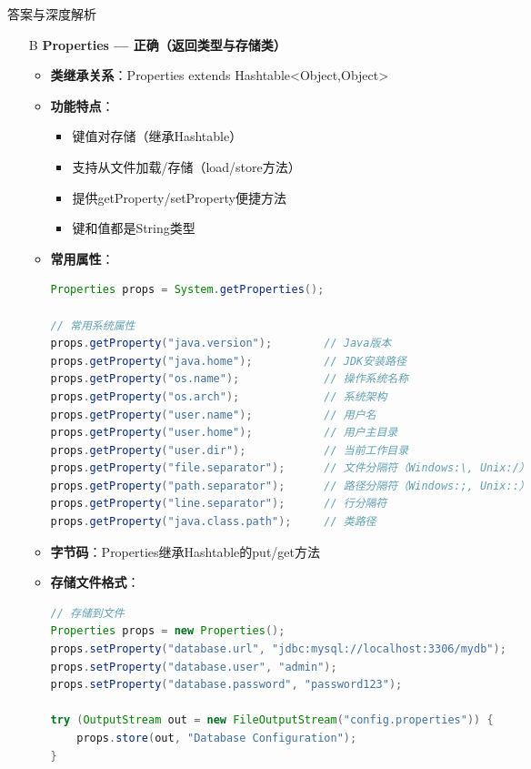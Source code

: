 \documentclass[12pt, a4paper]{ctexart}
\begin{document}
\begin{enumerate}[label=\textbf{\arabic*.}]
\begin{bluebox}{答案与深度解析}
\begin{itemize}[leftmargin=*, nosep, label={}]
			      \item[B] \textbf{Properties — 正确（返回类型与存储类）}
			            \begin{itemize}[label={}, leftmargin=*, nosep]
				            \item \textbf{类继承关系}：Properties extends Hashtable<Object,Object>
				            \item \textbf{功能特点}：
				                  \begin{itemize}[label={}, nosep]
					                  \item 键值对存储（继承Hashtable）
					                  \item 支持从文件加载/存储（load/store方法）
					                  \item 提供getProperty/setProperty便捷方法
					                  \item 键和值都是String类型
				                  \end{itemize}
				            \item \textbf{常用属性}：
				                  \begin{lstlisting}[language=Java]
Properties props = System.getProperties();

// 常用系统属性
props.getProperty("java.version");        // Java版本
props.getProperty("java.home");           // JDK安装路径
props.getProperty("os.name");             // 操作系统名称
props.getProperty("os.arch");             // 系统架构
props.getProperty("user.name");           // 用户名
props.getProperty("user.home");           // 用户主目录
props.getProperty("user.dir");            // 当前工作目录
props.getProperty("file.separator");      // 文件分隔符（Windows:\, Unix:/）
props.getProperty("path.separator");      // 路径分隔符（Windows:;, Unix::）
props.getProperty("line.separator");      // 行分隔符
props.getProperty("java.class.path");     // 类路径
				            \end{lstlisting}
				            \item \textbf{字节码}：Properties继承Hashtable的put/get方法
				            \item \textbf{存储文件格式}：
				                  \begin{lstlisting}[language=Java]
// 存储到文件
Properties props = new Properties();
props.setProperty("database.url", "jdbc:mysql://localhost:3306/mydb");
props.setProperty("database.user", "admin");
props.setProperty("database.password", "password123");

try (OutputStream out = new FileOutputStream("config.properties")) {
    props.store(out, "Database Configuration");
}


\end{lstlisting}
\end{itemize}
\end{itemize}
\end{bluebox}
\end{enumerate}
\end{document}
